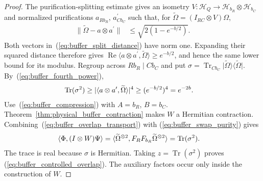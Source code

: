 \begin{proof}\leanok
    The purification-splitting estimate gives an isometry
    $V:\mathcal H_Q\to\mathcal H_{b_R}\otimes\mathcal H_{b_C}$ and
    normalized purifications $a_{Rb_R}$, $a^{\prime}_{Cb_C}$ such that, for
    $\widetilde\Omega=(I_{RC}\otimes V)\Omega$,
    \begin{align}
        \|\widetilde\Omega-a\otimes a^{\prime}\|
        &\le\sqrt{2(1-e^{-b/2})}.
        \label{eq:buffer_split_distance}
    \end{align}
    Both vectors in~(\ref{eq:buffer_split_distance}) have norm one.
    Expanding their squared distance therefore gives
    $\operatorname{Re}\langle a\otimes a^{\prime},\widetilde\Omega\rangle
    \ge e^{-b/2}$, and hence the same lower bound for its modulus.
    Regroup across $Rb_R\mid Cb_C$ and put
    $\sigma=\operatorname{Tr}_{Cb_C}
        \vert\widetilde\Omega\rangle\langle\widetilde\Omega\vert$.
    By~(\ref{eq:buffer_fourth_power}),
    \begin{align}
        \operatorname{Tr}(\sigma^2)
        &\ge|\langle a\otimes a^{\prime},\widetilde\Omega\rangle|^4
         \ge(e^{-b/2})^4=e^{-2b}.
        \notag
    \end{align}
    Use~(\ref{eq:buffer_compression}) with $A=b_R$, $B=b_C$.
    Theorem~\ref{thm:physical_buffer_contraction} makes $W$ a Hermitian
    contraction. Combining~(\ref{eq:buffer_overlap_transport}) with
    (\ref{eq:buffer_swap_purity}) gives
    \begin{align}
        \langle\Phi,(I\otimes W)\Psi\rangle
        &=\langle\widetilde\Omega^{\otimes2},
             F_RF_{b_R}\widetilde\Omega^{\otimes2}\rangle
         =\operatorname{Tr}(\sigma^2).
        \notag
    \end{align}
    The trace is real because $\sigma$ is Hermitian. Taking
    $z=\operatorname{Tr}(\sigma^2)$ proves
    (\ref{eq:buffer_controlled_overlap}). The auxiliary factors occur
    only inside the construction of $W$.
\end{proof}


